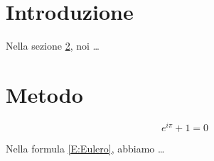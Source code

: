 \documentclass{article}
\begin{document}
\section{Introduzione}
\label{S:Introduzione}

Nella sezione \ref{S:Metodo}, noi \ldots

\section{Metodo}
\label{S:Metodo}

\begin{equation}
\label{E:Eulero}
e^{i\pi} + 1 = 0
\end{equation}

Nella formula \eqref{E:Eulero}, abbiamo \ldots
\end{document}

